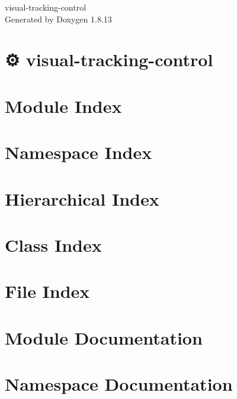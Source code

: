 \documentclass[twoside]{book}
\newcommand{\+}{\discretionary{\mbox{\scriptsize$\hookleftarrow$}}{}{}}
\newcommand{\clearemptydoublepage}{%
  \newpage{\pagestyle{empty}\cleardoublepage}%
}
\begin{document}
\hypersetup{pageanchor=false,
             bookmarksnumbered=true,
             pdfencoding=unicode
            }
\begin{titlepage}
\vspace*{7cm}
\begin{center}%
{\Large visual-\/tracking-\/control }\\
\vspace*{1cm}
{\large Generated by Doxygen 1.8.13}\\
\end{center}
\end{titlepage}
\clearemptydoublepage
{}
\tableofcontents
\clearemptydoublepage
{}
\hypersetup{pageanchor=true}

\chapter{⚙️ visual-\/tracking-\/control}
\label{index}\hypertarget{index}{}
\chapter{Module Index}

\chapter{Namespace Index}

\chapter{Hierarchical Index}

\chapter{Class Index}

\chapter{File Index}

\chapter{Module Documentation}



\chapter{Namespace Documentation}

\end{document}
